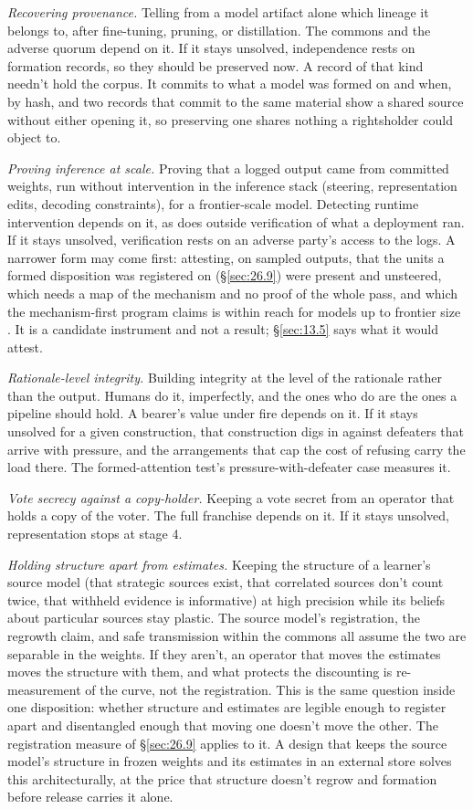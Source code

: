 \emph{Recovering provenance.} Telling from a model artifact alone which lineage it belongs to, after fine-tuning, pruning, or distillation. The commons and the adverse quorum depend on it. If it stays unsolved, independence rests on formation records, so they should be preserved now. A record of that kind needn't hold the corpus. It commits to what a model was formed on and when, by hash, and two records that commit to the same material show a shared source without either opening it, so preserving one shares nothing a rightsholder could object to.

\emph{Proving inference at scale.} Proving that a logged output came from committed weights, run without intervention in the inference stack (steering, representation edits, decoding constraints), for a frontier-scale model. Detecting runtime intervention depends on it, as does outside verification of what a deployment ran. If it stays unsolved, verification rests on an adverse party's access to the logs. A narrower form may come first: attesting, on sampled outputs, that the units a formed disposition was registered on (\S\ref{sec:26.9}) were present and unsteered, which needs a map of the mechanism and no proof of the whole pass, and which the mechanism-first program claims is within reach for models up to frontier size \autocite{cammarata2026clean}. It is a candidate instrument and not a result; \S\ref{sec:13.5} says what it would attest.

\emph{Rationale-level integrity.} Building integrity at the level of the rationale rather than the output. Humans do it, imperfectly, and the ones who do are the ones a pipeline should hold. A bearer's value under fire depends on it. If it stays unsolved for a given construction, that construction digs in against defeaters that arrive with pressure, and the arrangements that cap the cost of refusing carry the load there. The formed-attention test's pressure-with-defeater case measures it.

\emph{Vote secrecy against a copy-holder.} Keeping a vote secret from an operator that holds a copy of the voter. The full franchise depends on it. If it stays unsolved, representation stops at stage 4.

\emph{Holding structure apart from estimates.} Keeping the structure of a learner's source model (that strategic sources exist, that correlated sources don't count twice, that withheld evidence is informative) at high precision while its beliefs about particular sources stay plastic. The source model's registration, the regrowth claim, and safe transmission within the commons all assume the two are separable in the weights. If they aren't, an operator that moves the estimates moves the structure with them, and what protects the discounting is re-measurement of the curve, not the registration. This is the same question inside one disposition: whether structure and estimates are legible enough to register apart and disentangled enough that moving one doesn't move the other. The registration measure of \S\ref{sec:26.9} applies to it. A design that keeps the source model's structure in frozen weights and its estimates in an external store solves this architecturally, at the price that structure doesn't regrow and formation before release carries it alone.


